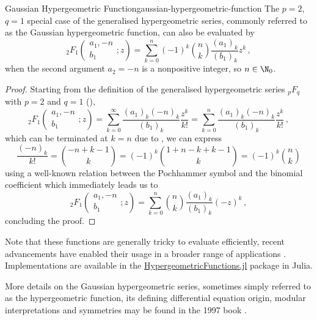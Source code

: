 \begin{lemma}{Gaussian Hypergeometric Function}{gaussian-hypergeometric-function}
  The $p=2$, $q=1$ special case of the generalised hypergeometric series, commonly referred to as the Gaussian hypergeometric function, can also be evaluated by
  $${}_2F_1\left(\begin{matrix}a_{1}, -n \\b_{1}\end{matrix}; z\right) = \sum_{k=0}^n (-1)^k \binom{n}{k} \frac{(a_1)_k}{(b_1)_k}z^k\,,$$
  when the second argument $a_2 = -n$ is a nonpositive integer, so $n \in \N_0$.
\end{lemma}
\begin{proof}
  Starting from the definition of the generalised hypergeometric series ${}_pF_q$ with $p=2$ and $q=1$ (),
  $${}_2F_1\left(\begin{matrix}a_{1}, -n \\b_{1}\end{matrix}; z\right) = \sum_{k=0}^{\infty} \frac{(a_1)_k (-n)_k}{(b_1)_k} \frac{z^k}{k!} = \sum_{k=0}^{n} \frac{(a_1)_k (-n)_k}{(b_1)_k} \frac{z^k}{k!}\,,$$
  which can be terminated at $k=n$ due to , we can express
  $$\frac{(-n)_k}{k!} = \binom{-n+k-1}{k} = (-1)^k \binom{1+n-k+k-1}{k} = (-1)^k \binom{n}{k}$$
  using a well-known relation between the Pochhammer symbol and the binomial coefficient which immediately leads us to
  $${}_2F_1\left(\begin{matrix}a_{1}, -n \\b_{1}\end{matrix}; z\right) = \sum_{k=0}^n \binom{n}{k} \frac{(a_1)_k}{(b_1)_k}(-z)^k\,,$$
  concluding the proof.
\end{proof}

Note that these functions are generally tricky to evaluate efficiently, recent advancements have enabled their usage in a broader range of applications \parencite{2008-hypergeometric-functions-jl-1,2017-hypergeometric-functions-jl-2,2023-hypergeometric-functions-jl-3}.
Implementations are available in the \href{https://github.com/JuliaMath/HypergeometricFunctions.jl}{HypergeometricFunctions.jl} package in Julia.

More details on the Gaussian hypergeometric series, sometimes simply referred to as the hypergeometric function, its defining differential equation origin, modular interpretations and symmetries may be found in the 1997 book  \parencite{1997-hypergeometric-functions-my-love}.
